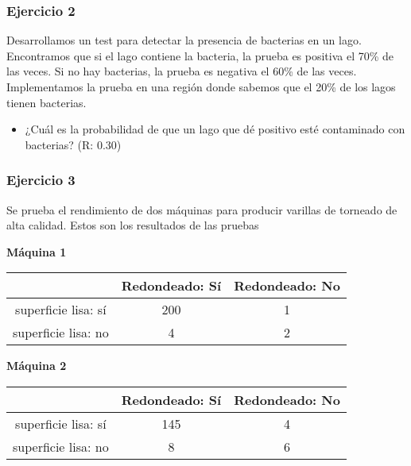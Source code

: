 \documentclass[
]{book}
\providecommand{\tightlist}{%
  \setlength{\itemsep}{0pt}\setlength{\parskip}{0pt}}
\begin{document}
\hypertarget{ejercicio-2-2}{%
\subsubsection{Ejercicio 2}\label{ejercicio-2-2}}

Desarrollamos un test para detectar la presencia de bacterias en un lago. Encontramos que si el lago contiene la bacteria, la prueba es positiva el 70\% de las veces. Si no hay bacterias, la prueba es negativa el 60\% de las veces. Implementamos la prueba en una región donde sabemos que el 20\% de los lagos tienen bacterias.

\begin{itemize}
\tightlist
\item
  ¿Cuál es la probabilidad de que un lago que dé positivo esté contaminado con bacterias? (R: 0.30)
\end{itemize}

\hypertarget{ejercicio-3}{%
\subsubsection{Ejercicio 3}\label{ejercicio-3}}

Se prueba el rendimiento de dos máquinas para producir varillas de torneado de alta calidad. Estos son los resultados de las pruebas

\textbf{Máquina 1}

\begin{longtable}[]{@{}ccc@{}}
\toprule
& Redondeado: Sí & Redondeado: No \\
\midrule
\endhead
superficie lisa: sí & 200 & 1 \\
superficie lisa: no & 4 & 2 \\
\bottomrule
\end{longtable}

\textbf{Máquina 2}

\begin{longtable}[]{@{}ccc@{}}
\toprule
& Redondeado: Sí & Redondeado: No \\
\midrule
\endhead
superficie lisa: sí & 145 & 4 \\
superficie lisa: no & 8 & 6 \\
\bottomrule
\end{longtable}
\end{document}
